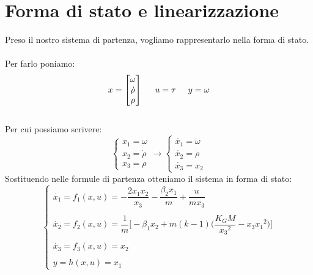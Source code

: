 \section{Forma di stato e linearizzazione}

    Preso il nostro sistema di partenza, vogliamo rappresentarlo nella forma di stato.\\\\
    Per farlo poniamo:\\
    \begin{equation*}
        x=\begin{bmatrix}   
            \omega\\ 
            \dot{\rho}\\ 
            \rho 
        \end{bmatrix}\hspace{0.5cm}
        u=\tau\hspace{0.5cm}
        y=\omega
    \end{equation*}\\
    Per cui possiamo scrivere:
    \begin{equation*}
        \left\{ \begin{array}{ll}
            x_1=\omega\\
            x_2=\dot{\rho}\\
            x_3=\rho
        \end{array} \right.
        \rightarrow
        \left\{ \begin{array}{ll}
            \dot{x_1}=\dot{\omega}\\
            \dot{x_2}=\ddot{\rho}\\
            \dot{x_3}=x_2
        \end{array} \right.
    \end{equation*}
    Sostituendo nelle formule di partenza otteniamo il sistema in forma di stato:
    \begin{equation}
        \left\{ \begin{array}{ll}
            \dot{x_1}= f_1(x,u) = -\dfrac{2x_1x_2}{x_3}-\dfrac{\beta_2x_1}{m}+\dfrac{u}{mx_3}\\\\
            \dot{x_2}= f_2(x,u) = \dfrac{1}{m}\biggl[-\beta_1x_2+m(k-1)\biggl(\dfrac{K_GM}{{x_3}^2}-x_3{x_1}^2\biggr)\biggr]\\\\
            \dot{x_3}= f_3(x,u) = x_2\\\\
            y= h(x,u) = x_1
        \end{array} \right.
    \end{equation}
